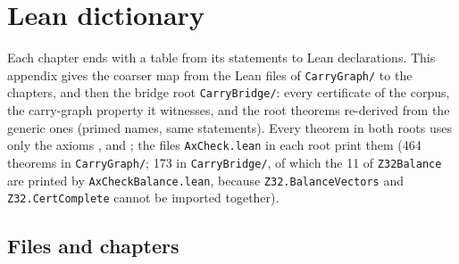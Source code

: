 \chapter{Lean dictionary}\label{app:dictionary}

Each chapter ends with a table from its statements to Lean declarations. This appendix gives
the coarser map from the Lean files of \texttt{CarryGraph/} to the chapters, and then the bridge
root \texttt{CarryBridge/}: every certificate of the corpus, the carry-graph property it
witnesses, and the root theorems re-derived from the generic ones (primed names, same
statements). Every theorem in both roots uses only the axioms ,
 and ; the files \texttt{AxCheck.lean} in each root
print them (464 theorems in \texttt{CarryGraph/}; 173 in \texttt{CarryBridge/}, of which the 11 of
\texttt{Z32Balance} are printed by \texttt{AxCheckBalance.lean}, because \texttt{Z32.BalanceVectors}
and \texttt{Z32.CertComplete} cannot be imported together).

\section*{Files and chapters}

